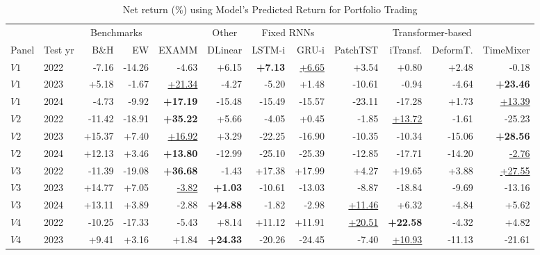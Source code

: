 


\begin{table}[t]
\centering
\caption{Net return (\%) using Model's Predicted Return for Portfolio Trading}
\label{tab:net-returns}
\begin{threeparttable}
\footnotesize
\begin{tabular}{llrrrrrrrrrr}
\toprule
 & & \multicolumn{2}{c}{Benchmarks} &  & \multicolumn{1}{c}{Other} & \multicolumn{2}{c}{Fixed RNNs} & \multicolumn{4}{c}{Transformer-based} \\
\cmidrule(lr){3-4} \cmidrule(lr){6-6} \cmidrule(lr){7-8} \cmidrule(lr){9-12}
Panel & Test yr & B\&H & EW & EXAMM & DLinear & LSTM-i & GRU-i & PatchTST & iTransf. & DeformT. & TimeMixer \\
\midrule
$V1$ & 2022 & -7.16 & -14.26 & -4.63 & +6.15 & \textbf{+7.13} & \underline{+6.65} & +3.54 & +0.80 & +2.48 & -0.18 \\
$V1$ & 2023 & +5.18 & -1.67 & \underline{+21.34} & -4.27 & -5.20 & +1.48 & -10.61 & -0.94 & -4.64 & \textbf{+23.46} \\
$V1$ & 2024 & -4.73 & -9.92 & \textbf{+17.19} & -15.48 & -15.49 & -15.57 & -23.11 & -17.28 & +1.73 & \underline{+13.39} \\
\addlinespace
$V2$ & 2022 & -11.42 & -18.91 & \textbf{+35.22} & +5.66 & -4.05 & +0.45 & -1.85 & \underline{+13.72} & -1.61 & -25.23 \\
$V2$ & 2023 & +15.37 & +7.40 & \underline{+16.92} & +3.29 & -22.25 & -16.90 & -10.35 & -10.34 & -15.06 & \textbf{+28.56} \\
$V2$ & 2024 & +12.13 & +3.46 & \textbf{+13.80} & -12.99 & -25.10 & -25.39 & -12.85 & -17.71 & -14.20 & \underline{-2.76} \\
\addlinespace
$V3$ & 2022 & -11.39 & -19.08 & \textbf{+36.68} & -1.43 & +17.38 & +17.99 & +4.27 & +19.65 & +3.88 & \underline{+27.55} \\
$V3$ & 2023 & +14.77 & +7.05 & \underline{-3.82} & \textbf{+1.03} & -10.61 & -13.03 & -8.87 & -18.84 & -9.69 & -13.16 \\
$V3$ & 2024 & +13.11 & +3.89 & -2.88 & \textbf{+24.88} & -1.82 & -2.98 & \underline{+11.46} & +6.32 & -4.84 & +5.62 \\
\addlinespace
$V4$ & 2022 & -10.25 & -17.33 & -5.43 & +8.14 & +11.12 & +11.91 & \underline{+20.51} & \textbf{+22.58} & -4.32 & +4.82 \\
$V4$ & 2023 & +9.41 & +3.16 & +1.84 & \textbf{+24.33} & -20.26 & -24.45 & -7.40 & \underline{+10.93} & -11.13 & -21.61 \\

\end{tabular}
\end{threeparttable}
\end{table}
